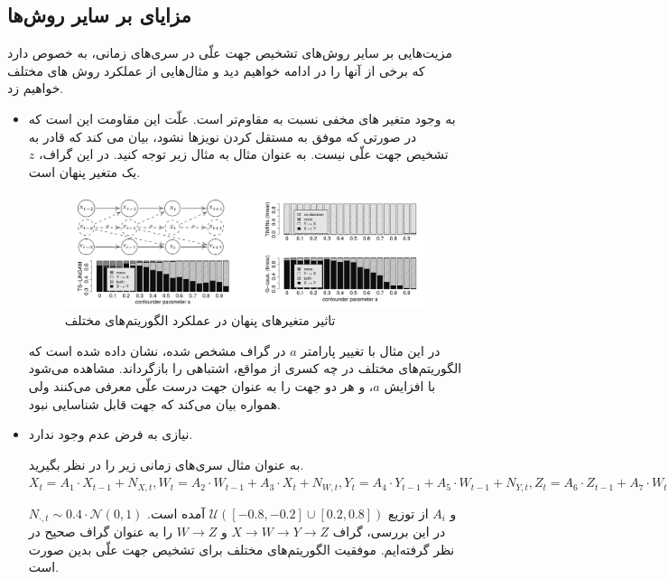 \documentclass[a4paper,12pt]{article}
\newcommand{\eps}{{N}}
\begin{document}
\subsection{
	مزایای  بر سایر روش‌ها
}
مزیت‌هایی بر سایر روش‌های تشخیص جهت علّی در سری‌های زمانی، به خصوص 
دارد که برخی از آنها را در ادامه خواهیم دید و مثال‌هایی از عملکرد روش ‌های مختلف خواهیم زد.
\begin{itemize}
	\item 
به وجود متغیر های مخفی نسبت به 
مقاوم‌تر است. علّت این مقاومت این است که در صورتی که موفق به مستقل کردن نویز‌ها نشود، بیان می کند که قادر به تشخیص جهت علّی نیست. به عنوان مثال به مثال زیر توجه کنید. در این گراف، $z$ یک متغیر پنهان است.
\begin{figure}[h!]
	\begin{center}
		\includegraphics[width=\textwidth]{confounder.png}
		\caption{
تاثیر متغیر‌های پنهان در عملکرد الگوریتم‌های مختلف
		}
	\end{center}
\end{figure}
در این مثال با تغییر پارامتر‌ $a$ در گراف مشخص شده، نشان داده شده است که الگوریتم‌های مختلف در چه کسری از مواقع، 
اشتباهی را بازگرداند. مشاهده می‌شود با افزایش $a$، 
و 
هر دو جهت را به عنوان جهت درست علّی معرفی می‌کنند ولی 
همواره بیان ‌می‌کند که جهت قابل شناسایی نبود.
\item 
{}
نیازی به فرض عدم وجود 
ندارد. 
 
 به عنوان مثال  سری‌های زمانی زیر را در نظر بگیرید.
$X_t=A_1\cdot X_{t-1}+\eps_{X,t},
W_t=A_2\cdot W_{t-1}+A_3\cdot X_{t}+\eps_{W,t},
Y_t=A_4\cdot Y_{t-1}+A_5\cdot W_{t-1}+\eps_{Y,t},
Z_t=A_6\cdot Z_{t-1}+A_7\cdot W_t+A_8\cdot Y_{t-1}+\eps_{Z,t}
$

$\eps_{\cdot, t} \sim 0.4 \cdot \mathcal N(0,1)$ 
و
 $A_i$ 
 از توزیع
$\mathcal{U}([-0.8,-0.2]\cup [0.2,0.8])$
آمده است.
در این بررسی، گراف
 $X \rightarrow W \rightarrow Y \rightarrow Z$ و  $W \rightarrow Z$ 
 را به عنوان گراف صحیح در نظر گرفته‌ایم. موفقیت الگوریتم‌های مختلف برای تشخیص جهت علّی بدین صورت است.
 

\end{itemize}
\end{document}
